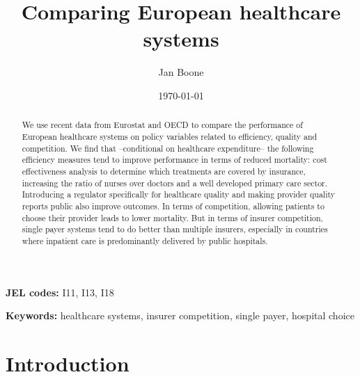 \documentclass{article}
\author{Jan Boone\inst{*}}
\date{\today}
\title{Comparing European healthcare systems}
\begin{document}
\maketitle
\begin{PREFACE}
\maketitle
\end{PREFACE}



 \begin{abstract}

We use recent data from Eurostat and OECD to compare the performance of European healthcare systems on policy variables related to efficiency, quality and competition. We find that --conditional on healthcare expenditure-- the following efficiency measures tend to improve performance in terms of reduced mortality: cost effectiveness analysis to determine which treatments are covered by insurance, increasing the ratio of nurses over doctors and a well developed primary care sector. Introducing a regulator specifically for healthcare quality and making provider quality reports public also improve outcomes. In terms of competition, allowing patients to choose their provider leads to lower mortality. But in terms of insurer competition, single payer systems tend to do better than multiple insurers, especially in countries where inpatient care is predominantly delivered by public hospitals.

 \end{abstract}


\textbf{JEL codes:} I11, I13, I18

\textbf{Keywords:} healthcare systems, insurer competition, single payer, hospital choice


\vspace*{\fill}

\newpage

\section{Introduction}
\label{sec:org520754a}
\end{document}
